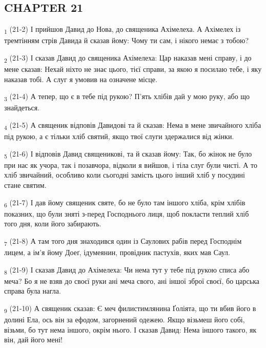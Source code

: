 \subsection{CHAPTER 21}
\begin{tcolorbox}
\textsubscript{1} (21-2) І прийшов Давид до Нова, до священика Ахімелеха. А Ахімелех із тремтінням стрів Давида й сказав йому: Чому ти сам, і нікого немає з тобою?
\end{tcolorbox}
\begin{tcolorbox}
\textsubscript{2} (21-3) І сказав Давид до священика Ахімелеха: Цар наказав мені справу, і до мене сказав: Нехай ніхто не знає цього, тієї справи, за якою я посилаю тебе, і яку наказав тобі. А слуг я умовив на означене місце.
\end{tcolorbox}
\begin{tcolorbox}
\textsubscript{3} (21-4) А тепер, що є в тебе під рукою? П'ять хлібів дай у мою руку, або що знайдеться.
\end{tcolorbox}
\begin{tcolorbox}
\textsubscript{4} (21-5) А священик відповів Давидові та й сказав: Нема в мене звичайного хліба під рукою, а є тільки хліб святий, якщо твої слуги здержалися від жінки.
\end{tcolorbox}
\begin{tcolorbox}
\textsubscript{5} (21-6) І відповів Давид священикові, та й сказав йому: Так, бо жінок не було при нас як учора, так і позавчора, відколи я вийшов, і тіла слуг були чисті. А то хліб звичайний, особливо коли сьогодні замість цього інший хліб у посудині стане святим.
\end{tcolorbox}
\begin{tcolorbox}
\textsubscript{6} (21-7) І дав йому священик святе, бо не було там іншого хліба, крім хлібів показних, що були зняті з-перед Господнього лиця, щоб покласти теплий хліб того дня, коли його забирають.
\end{tcolorbox}
\begin{tcolorbox}
\textsubscript{7} (21-8) А там того дня знаходився один із Саулових рабів перед Господнім лицем, а ім'я йому Доеґ, ідумеянин, провідник пастухів, яких мав Саул.
\end{tcolorbox}
\begin{tcolorbox}
\textsubscript{8} (21-9) І сказав Давид до Ахімелеха: Чи нема тут у тебе під рукою списа або меча? Бо я не взяв до своєї руки ані меча свого, ані іншої зброї своєї, бо царська справа була нагла.
\end{tcolorbox}
\begin{tcolorbox}
\textsubscript{9} (21-10) А священик сказав: Є меч филистимлянина Ґоліята, що ти вбив його в долині Ела, ось він за ефодом, загорнений одежею. Якщо візьмеш його собі, візьми, бо тут нема іншого, окрім нього. І сказав Давид: Нема іншого такого, як він, дай його мені!
\end{tcolorbox}
